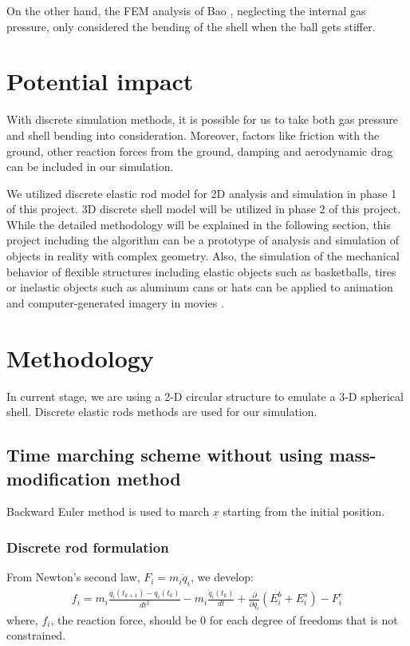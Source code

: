 \documentclass[letterpaper,9pt,twocolumn]{extarticle}
\begin{document}
	On the other hand, the FEM analysis of Bao \cite{Bao15}, neglecting the internal gas pressure, only considered the bending of the shell when the ball gets stiffer. 
\section{Potential impact}
	With discrete simulation methods, it is possible for us to take both gas pressure and shell bending into consideration. Moreover, factors like friction with the ground, other reaction forces from the ground, damping and aerodynamic drag can be included in our simulation. 

 We utilized discrete elastic rod model for 2D analysis and simulation in phase 1 of this project. 3D discrete shell model will be utilized in phase 2 of this project. While the detailed methodology will be explained in the following section, this project including the algorithm can be a prototype of analysis and simulation of objects in reality with complex geometry. Also, the simulation of the mechanical behavior of flexible structures including elastic objects such as basketballs, tires or inelastic objects such as aluminum cans or hats can be applied to animation and computer-generated imagery in movies \cite{Grinspun08}.
\section{Methodology}
	In current stage, we are using a 2-D circular structure to emulate a 3-D spherical shell. Discrete elastic rods \cite{Bergou08} methods are used for our simulation.	

	\subsection{Time marching scheme without using mass-modification method}
		Backward Euler method is used to march $\underline x$ starting from the initial position.
		\subsubsection{Discrete rod formulation}
			From Newton's second law, $ F_i = m_i\ddot q_i$, we develop:
			\begin{align}
				f_i = m_i\frac{q_i(t_{k+1}) - q_i(t_k)}{dt^2} - m_i\frac{\dot q_i(t_k)}{dt} + \frac{\partial}{\partial q_i}(E_i^b + E_i^s) - F_i^e
			\end{align}
			where, $f_i$, the reaction force, should be $0$ for each degree of freedoms that is not constrained.
			
\end{document}
